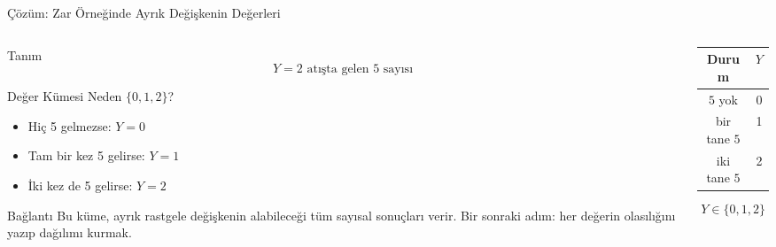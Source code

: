﻿\documentclass[light]{lutbeamer}
\begin{document}
\begin{frame}{Çözüm: Zar Örneğinde Ayrık Değişkenin Değerleri}
    \small
    \begin{columns}[T]
        \begin{column}{0.52\textwidth}
            \begin{block}{Tanım}
                \[
                Y = \text{2 atışta gelen 5 sayısı}
                \]
            \end{block}

            \begin{block}{Değer Kümesi Neden \(\{0,1,2\}\)?}
                \begin{itemize}
                    \item Hiç 5 gelmezse: \(Y=0\)
                    \item Tam bir kez 5 gelirse: \(Y=1\)
                    \item İki kez de 5 gelirse: \(Y=2\)
                \end{itemize}
            \end{block}

            \begin{alertblock}{Bağlantı}
                Bu küme, ayrık rastgele değişkenin alabileceği tüm sayısal sonuçları verir. Bir sonraki adım: her değerin olasılığını yazıp dağılımı kurmak.
            \end{alertblock}
        \end{column}
        \begin{column}{0.46\textwidth}
            \centering

            \vspace{0.2cm}
            \begin{tabular}{c|c}
                Durum & \(Y\) \\
                \hline
                \(5\) yok & 0 \\
                bir tane \(5\) & 1 \\
                iki tane \(5\) & 2 \\
            \end{tabular}

            \vspace{0.2cm}
            \[
            Y \in \{0,1,2\}
            \]
        \end{column}
    \end{columns}
\end{frame}
\end{document}
